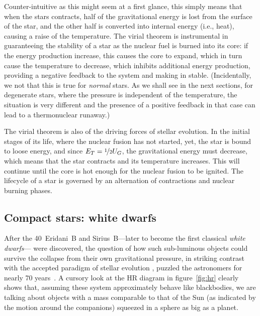 Counter-intuitive as this might seem at a first glance, this simply means that
when the stars contracts, half of the gravitational energy is lost from the surface
of the star, and the other half is converted into internal energy (i.e., heat),
causing a raise of the temperature.
The virial theorem is instrumental in guaranteeing the stability of a star as the
nuclear fuel is burned into its core: if the energy production increase, this
causes the core to expand, which in turn cause the temperature to decrease, which
inhibits additional energy production, providing a negative feedback to the system
and making in stable. (Incidentally, we not that this is true for \emph{normal} stars.
As we shall see in the next sections, for degenerate stars, where the pressure is
independent of the temperature, the situation is very different and the presence
of a positive feedback in that case can lead to a thermonuclear runaway.)

The virial theorem is also of the driving forces of stellar evolution. In the initial
stages of its life, where the nuclear fusion has not started, yet, the
star is bound to loose energy, and since $E_T = \nicefrac{1}{2}U_G$, the gravitational
energy must decrease, which means that the star contracts and its temperature increases.
This will continue until the core is hot enough for the nuclear fusion to be ignited.
The lifecycle of a star is governed by an alternation of contractions and nuclear
burning phases.



\subsection{Compact stars: white dwarfs}
\label{sec:white_dwarfs}

After the 40~Eridani~B and Sirius~B---later to become the first classical
\emph{white dwarfs}--- were discovered, the question of how such sub-luminous objects
could survive the collapse from their own gravitational pressure, in striking
contrast with the accepted paradigm of stellar evolution%
,
puzzled the astronomers for nearly 70 years~\cite{2009JHA....40..137H}.
A cursory look at the HR diagram in figure~\ref{fig:hr} clearly shows that, assuming
these system approximately behave like blackbodies, we are talking about
objects with a mass comparable to that of the Sun (as indicated by the motion
around the companions) squeezed in a sphere as big as a planet.

